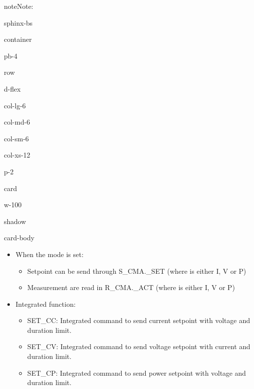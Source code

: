 \documentclass[letterpaper,10pt,english]{jupyterBook}
\begin{document}
\begin{sphinxadmonition}{note}{Note:}
\begin{sphinxuseclass}{sphinx-bs}
\begin{sphinxuseclass}{container}
\begin{sphinxuseclass}{pb-4}
\begin{sphinxuseclass}{row}
\begin{sphinxuseclass}{d-flex}
\begin{sphinxuseclass}{col-lg-6}
\begin{sphinxuseclass}{col-md-6}
\begin{sphinxuseclass}{col-sm-6}
\begin{sphinxuseclass}{col-xs-12}
\begin{sphinxuseclass}{p-2}
\begin{sphinxuseclass}{card}
\begin{sphinxuseclass}{w-100}
\begin{sphinxuseclass}{shadow}
\begin{sphinxuseclass}{card-body}
\begin{itemize}
\begin{itemize}
\item {} 
\sphinxAtStartPar
{}: Battery is in Current mode

\item {} 
\sphinxAtStartPar
{}: Battery is in Voltage mode

\item {} 
\sphinxAtStartPar
{}: Battery is in Power mode

\item {} 
\sphinxAtStartPar
{}

\end{itemize}

\item {} 
\sphinxAtStartPar
When the mode is set:
\begin{itemize}
\item {} 
\sphinxAtStartPar
Setpoint can be send through S\_CMA.\_SET (where  is either I, V or P)

\item {} 
\sphinxAtStartPar
Measurement are read in R\_CMA.\_ACT (where  is either I, V or P)

\end{itemize}

\item {} 
\sphinxAtStartPar
Integrated function:
\begin{itemize}
\item {} 
\sphinxAtStartPar
SET\_CC: Integrated command to send current setpoint with voltage and duration limit.

\item {} 
\sphinxAtStartPar
SET\_CV: Integrated command to send voltage setpoint with current and duration limit.

\item {} 
\sphinxAtStartPar
SET\_CP: Integrated command to send power setpoint with voltage and duration limit.

\end{itemize}

\end{itemize}


\end{sphinxuseclass}
\end{sphinxuseclass}
\end{sphinxuseclass}
\end{sphinxuseclass}
\end{sphinxuseclass}
\end{sphinxuseclass}
\end{sphinxuseclass}
\end{sphinxuseclass}
\end{sphinxuseclass}
\end{sphinxuseclass}
\end{sphinxuseclass}
\end{sphinxuseclass}
\end{sphinxuseclass}
\end{sphinxuseclass}
\end{sphinxadmonition}
\end{document}
